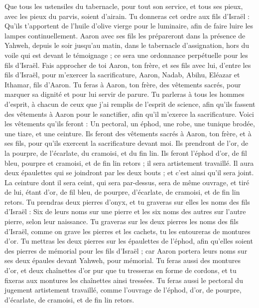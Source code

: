 \begin{multicols}{2}
Que tous les ustensiles du tabernacle, pour tout son service, et tous ses pieux, avec les pieux du parvis, soient d'airain.
Tu donneras cet ordre aux fils d'Israël : Qu'ils t'apportent de l'huile d'olive vierge pour le luminaire, afin de faire luire les lampes continuellement.
Aaron avec ses fils les prépareront dans la présence de Yahweh, depuis le soir jusqu'au matin, dans le tabernacle d'assignation, hors du voile qui est devant le témoignage ; ce sera une ordonnance perpétuelle pour les fils d'Israël.
\VerseOne{}Fais approcher de toi Aaron, ton frère, et ses fils avec lui, d'entre les fils d'Israël, pour m'exercer la sacrificature, Aaron, Nadab, Abihu, Eléazar et Ithamar, fils d'Aaron.
Tu feras à Aaron, ton frère, des vêtements sacrés, pour marquer sa dignité et pour lui servir de parure.
Tu parleras à tous les hommes d'esprit, à chacun de ceux que j'ai remplis de l'esprit de science, afin qu'ils fassent des vêtements à Aaron pour le sanctifier, afin qu'il m'exerce la sacrificature.
Voici les vêtements qu’ils feront : Un pectoral, un éphod, une robe, une tunique brodée, une tiare, et une ceinture. Ils feront des vêtements sacrés à Aaron, ton frère, et à ses fils, pour qu’ils exercent la sacrificature devant moi.
Ils prendront de l'or, de la pourpre, de l'écarlate, du cramoisi, et du fin lin.
Ils feront l’éphod d’or, de fil bleu, pourpre et cramoisi, et de fin lin retors ; il sera artistement travaillé.
Il aura deux épaulettes qui se joindront par les deux bouts ; et c’est ainsi qu’il sera joint.
La ceinture dont il sera ceint, qui sera par-dessus, sera de même ouvrage, et tiré de lui, étant d'or, de fil bleu, de pourpre, d'écarlate, de cramoisi, et de fin lin retors.
Tu prendras deux pierres d'onyx, et tu graveras sur elles les noms des fils d'Israël :
Six de leurs noms sur une pierre et les six noms des autres sur l'autre pierre, selon leur naissance.
Tu graveras sur les deux pierres les noms des fils d’Israël, comme on grave les pierres et les cachets, tu les entoureras de montures d’or.
Tu mettras les deux pierres sur les épaulettes de l'éphod, afin qu'elles soient des pierres de mémorial pour les fils d'Israël ; car Aaron portera leurs noms sur ses deux épaules devant Yahweh, pour mémorial.
Tu feras aussi des montures d'or,
et deux chaînettes d’or pur que tu tresseras en forme de cordons, et tu fixeras aux montures les chaînettes ainsi tressées.
Tu feras aussi le pectoral du jugement artistement travaillé, comme l'ouvrage de l'éphod, d'or, de pourpre, d'écarlate, de cramoisi, et de fin lin retors.

\end{multicols}
